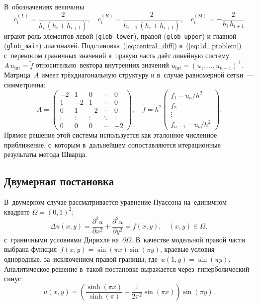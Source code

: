 В~обозначениях величины
\begin{equation}\label{eq:coeffs_1d}
	c^{(L)}_i = \frac{2}{h_i\,(h_i+h_{i+1})},\quad
	c^{(R)}_i = \frac{2}{h_{i+1}\,(h_i+h_{i+1})},\quad
	c^{(\mathrm{M})}_i = -\frac{2}{h_i\,h_{i+1}}
\end{equation}
играют роль элементов левой (\lstinline|glob_lower|), правой
(\lstinline|glob_upper|) и главной (\lstinline|glob_main|) диагоналей.
Подстановка~(\ref{eq:central_diff}) в~(\ref{eq:1d_problem}) с~переносом
граничных значений в~правую часть даёт линейную систему
$A\,u_{\mathrm{int}} = \tilde{f}$ относительно~вектора внутренних значений
$u_{\mathrm{int}}=(u_1,\dots,u_{n-1})^\top$. Матрица~$A$ имеет
трёхдиагональную структуру и в~случае равномерной сетки~--- симметрична:
\begin{equation}\label{eq:tridiag}
	A = \begin{pmatrix}
		-2     & 1      & 0      & \cdots & 0      \\
		1      & -2     & 1      & \cdots & 0      \\
		0      & 1      & -2     & \cdots & 0      \\
		\vdots & \vdots & \vdots & \ddots & \vdots \\
		0      & 0      & 0      & \cdots & -2
	\end{pmatrix},\quad
	\tilde{f} = h^2\!
	\begin{pmatrix}
		f_1 - u_a/h^2 \\
		f_2           \\
		\vdots        \\
		f_{n-1} - u_b/h^2
	\end{pmatrix}.
\end{equation}
Прямое решение этой системы используется как эталонное численное приближение,
с~которым в~дальнейшем сопоставляются итерационные результаты метода Шварца.

\subsection{Двумерная постановка}

В~двумерном случае рассматривается уравнение Пуассона на~единичном квадрате
$\Omega=(0,1)^2$:
\begin{equation}\label{eq:2d_problem}
	\Delta u(x,y) =
	\frac{\partial^{2}u}{\partial x^{2}} +
	\frac{\partial^{2}u}{\partial y^{2}} =
	f(x,y),
	\quad (x,y)\in\Omega,
\end{equation}
с~граничными условиями Дирихле на~$\partial\Omega$. В~качестве модельной правой
части выбрана функция~$f(x,y)=\sin(\pi x)\sin(\pi y)$, краевые условия
однородные, за~исключением правой границы, где~$u(1,y)=\sin(\pi y)$.
Аналитическое решение в~такой постановке выражается через~гиперболический
синус:
\begin{equation}\label{eq:exact_2d}
	u(x,y) = \left(\frac{\sinh(\pi x)}{\sinh(\pi)}
	- \frac{1}{2\pi^{2}}\sin(\pi x)\right)\sin(\pi y).
\end{equation}

